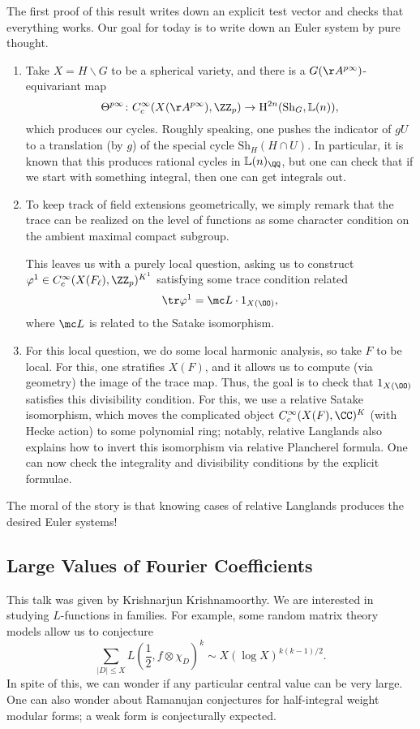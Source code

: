 \documentclass{article}
\begin{document}
The first proof of this result writes down an explicit test vector and checks that everything works. Our goal for today is to write down an Euler system by pure thought.
\begin{enumerate}
	\item Take $X=H\backslash G$ to be a spherical variety, and there is a $G(\AA^{p\infty})$-equivariant map
	\[\Theta^{p\infty}\colon C_c^\infty(X(\AA^{p\infty}),\ZZ_p)\to\mathrm H^{2n}(\mathrm{Sh}_G,\mathbb L(n)),\]
	which produces our cycles. Roughly speaking, one pushes the indicator of $gU$ to a translation (by $g$) of the special cycle $\mathrm{Sh}_H(H\cap U)$. In particular, it is known that this produces rational cycles in $\mathbb L(n)_\QQ$, but one can check that if we start with something integral, then one can get integrals out.

	\item To keep track of field extensions geometrically, we simply remark that the trace can be realized on the level of functions as some character condition on the ambient maximal compact subgroup.

	This leaves us with a purely local question, asking us to construct $\varphi^1\in C^\infty_c(X(F_\ell),\ZZ_p)^{K^1}$ satisfying some trace condition related
	\[\tr\varphi^1=\mc L\cdot 1_{X(\OO)},\]
	where $\mc L$ is related to the Satake isomorphism.

	\item For this local question, we do some local harmonic analysis, so take $F$ to be local. For this, one stratifies $X(F)$, and it allows us to compute (via geometry) the image of the trace map. Thus, the goal is to check that $1_{X(\OO)}$ satisfies this divisibility condition. For this, we use a relative Satake isomorphism, which moves the complicated object $C_c^\infty(X(F),\CC)^K$ (with Hecke action) to some polynomial ring; notably, relative Langlands also explains how to invert this isomorphism via relative Plancherel formula. One can now check the integrality and divisibility conditions by the explicit formulae.
\end{enumerate}
The moral of the story is that knowing cases of relative Langlands produces the desired Euler systems!

\subsection{Large Values of Fourier Coefficients}
This talk was given by Krishnarjun Krishnamoorthy. We are interested in studying $L$-functions in families. For example, some random matrix theory models allow us to conjecture
\[\sum_{\left|D\right|\le X}L\left(\frac 12,f\otimes\chi_D\right)^k\sim X(\log X)^{k(k-1)/2}.\]
In spite of this, we can wonder if any particular central value can be very large. One can also wonder about Ramanujan conjectures for half-integral weight modular forms; a weak form is conjecturally expected.
\end{document}
